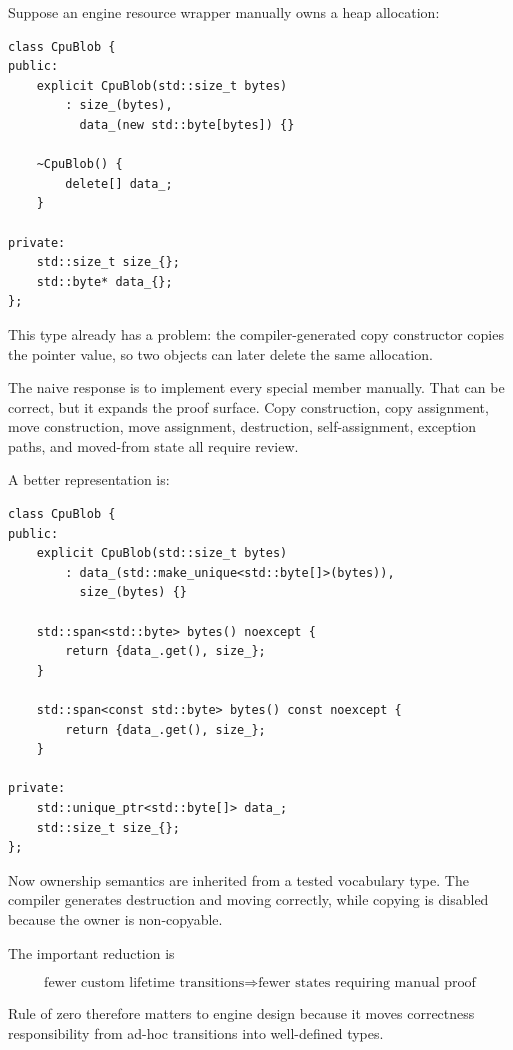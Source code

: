 \hypertarget{01-foundations-i-ch005-rule-of-zero-is-a-reduction-in-the-number-of-states-you-must-prove-correct}{}

Suppose an engine resource wrapper manually owns a heap allocation:

\begin{verbatim}
class CpuBlob {
public:
    explicit CpuBlob(std::size_t bytes)
        : size_(bytes),
          data_(new std::byte[bytes]) {}

    ~CpuBlob() {
        delete[] data_;
    }

private:
    std::size_t size_{};
    std::byte* data_{};
};
\end{verbatim}

This type already has a problem: the compiler-generated copy constructor copies the pointer value, so two objects can later delete the same allocation.

The naive response is to implement every special member manually. That can be correct, but it expands the proof surface. Copy construction, copy assignment, move construction, move assignment, destruction, self-assignment, exception paths, and moved-from state all require review.

A better representation is:

\begin{verbatim}
class CpuBlob {
public:
    explicit CpuBlob(std::size_t bytes)
        : data_(std::make_unique<std::byte[]>(bytes)),
          size_(bytes) {}

    std::span<std::byte> bytes() noexcept {
        return {data_.get(), size_};
    }

    std::span<const std::byte> bytes() const noexcept {
        return {data_.get(), size_};
    }

private:
    std::unique_ptr<std::byte[]> data_;
    std::size_t size_{};
};
\end{verbatim}

Now ownership semantics are inherited from a tested vocabulary type. The compiler generates destruction and moving correctly, while copying is disabled because the owner is non-copyable.

The important reduction is

\[
\boxed{
\text{fewer custom lifetime transitions}
\Rightarrow
\text{fewer states requiring manual proof}
}
\]

Rule of zero therefore matters to engine design because it moves correctness responsibility from ad-hoc transitions into well-defined types.

